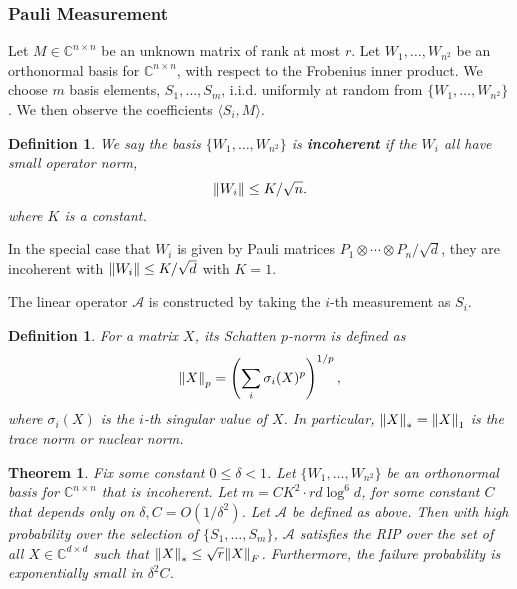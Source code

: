 \documentclass[10pt]{article}  %
\theoremstyle{plain}
\newtheorem{theorem}{Theorem}[section]
\newtheorem{definition}[thm]{Definition}
\numberwithin{equation}{section}
\newcommand{\innerp}[1]{\langle{#1}\rangle}
\def\mA{\mathcal{A}}
\def\C{\mathbb{C}}
\begin{document}
\subsubsection{Pauli Measurement}
Let $M\in \C^{n \times n}$ be an unknown matrix of rank at most $r$. Let $W_1, \dots, W_{n^2}$ be an orthonormal basis for $\C^{n \times n}$, with respect to the Frobenius inner product. We choose $m$ basis elements, $S_1, \dots, S_m$, i.i.d. uniformly at random from $\{W_1, \dots, W_{n^2}\}$. We then observe the coefficients $\innerp{S_i, M}$. 

\begin{definition}
	We say the basis $\{W_1, \dots, W_{n^2}\}$ is \textbf{incoherent} if the $W_i$ all have small operator norm, \\
	\begin{equation}
		\norm{W_i} \leq K/\sqrt{n}.
	\end{equation}
	where $K$ is a constant. 
\end{definition}

In the special case that $W_i$ is given by Pauli matrices $P_1 \otimes \cdots \otimes P_n/\sqrt{d}$, they are incoherent with $\norm{W_i} \leq K/\sqrt d$ with $K = 1$. 

The linear operator $\mA$ is constructed by taking the $i$-th measurement as $S_i$. 
\begin{definition}
	For a matrix $X$, its Schatten $p$-norm is defined as 
	\begin{equation}
		\norm{X}_p = \left(\sum_{i}\sigma_i(X)^p\right)^{1/p},
	\end{equation}
	where $\sigma_i(X)$ is the $i$-th singular value of $X$. In particular, $\norm{X}_* = \norm{X}_1$ is the trace norm or nuclear norm. 
\end{definition}

\begin{theorem}\cite[Theorem 2.1]{liuUniversalLowrankMatrix2011}
	Fix some constant $0 \leq \delta <1$. Let $\{W_1, \dots, W_{n^2}\}$ be an orthonormal basis for $\C^{n \times n}$ that is incoherent. Let $m = CK^2\cdot rd \log^6 d$, for some constant $C$ that depends only on $\delta, C = O(1/\delta^2)$. Let $\mA$ be defined as above. Then with high probability over the selection of $\{S_1, \dots, S_m\}$, $\mA$ satisfies the RIP over the set of all $X\in \C^{d \times d}$ such that $\norm{X}_* \leq \sqrt{r} \norm{X}_F$. Furthermore, the failure probability is exponentially small in $\delta^2C$. 
\end{theorem}
\end{document}
